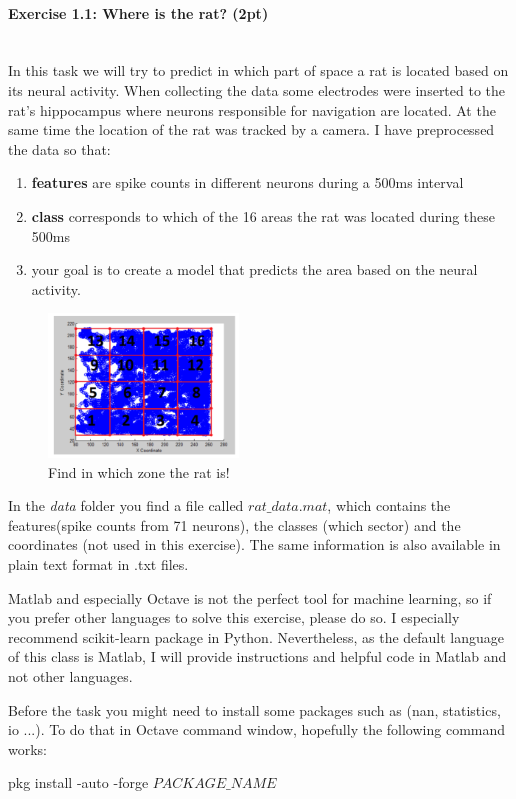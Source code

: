 \documentclass[a4paper,11pt]{article}
\newenvironment{exercise}[3]{\paragraph{Exercise #1: #2 (#3pt)}\ \\}{
\medskip}
\begin{document}
\begin{exercise}{1.1}{Where is the rat?}{2}
In this task we will try to predict in which part of space a rat is located based on its neural activity. When collecting the data some electrodes were inserted to the rat's hippocampus where neurons responsible for navigation are located. At the same time the location of the rat was tracked by a camera. I have preprocessed the data so that:
\begin{enumerate}
\item \textbf{features} are spike counts in different neurons during a 500ms interval
\item \textbf{class} corresponds to which of the 16 areas the rat was located during these 500ms
\item your goal is to create a model that predicts the area based on the neural activity.
\end{enumerate}

\begin{figure}
	\centering
	\vspace{-5pt}
	\includegraphics[width=0.45\textwidth]{rat.png}
	\caption{Find in which zone the rat is!}
	\label{fig:rat}
	
\end{figure}

In the \emph{data} folder you find a file called \emph{$rat\_data.mat$}, which contains the features(spike counts from 71 neurons), the classes (which sector) and the coordinates (not used in this exercise). The same information is also available in plain text format in .txt files.

Matlab and especially Octave is not the perfect tool for machine learning, so if you prefer other languages to solve this exercise, please do so. I especially recommend scikit-learn package in Python. Nevertheless, as the default language of this class is Matlab, I will provide instructions and helpful code in Matlab and not other languages.

Before the task you might need to install some packages such as (nan, statistics, io ...). To do that in Octave command window, hopefully the following command works:\\
\begin{center}
pkg install -auto -forge $PACKAGE\_NAME$
\end{center} 



\end{exercise}
\end{document}
